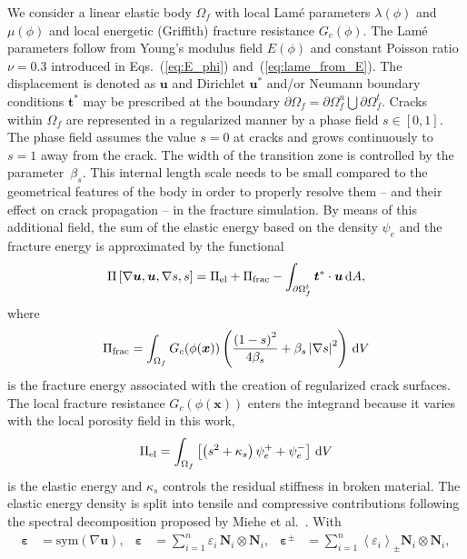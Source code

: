 \documentclass[
	pdflatex,
	sn-mathphys-num
]{sn-jnl}
\theoremstyle{thmstyleone}%
\theoremstyle{thmstyletwo}%
\theoremstyle{thmstylethree}%
\begin{document}
We consider a linear elastic body $\Omega_f$  with local
Lam\'{e} parameters $\lambda(\phi)$ and $\mu(\phi)$ and local
energetic (Griffith) fracture resistance $G_c(\phi)$. The Lam\'{e} parameters follow from
Young's modulus field $E(\phi)$ and constant Poisson ratio
$\nu=0.3$ introduced in Eqs.~(\ref{eq:E_phi})
and~(\ref{eq:lame_from_E}). The displacement is denoted as
$\boldsymbol{u}$ and Dirichlet $\boldsymbol{u}^*$ and/or
Neumann boundary conditions $\boldsymbol{t}^*$ may be prescribed
at the boundary
$\partial\Omega_f=\partial\Omega_f^u\bigcup\partial\Omega_f^t$.
Cracks within $\Omega_f$ are represented in a regularized manner by a phase
field $s\in\left[0,1\right]$.
The phase field assumes the value $s=0$ at cracks and grows
continuously to $s=1$ away from the crack. The width of the
transition zone is controlled by the parameter~$\beta_s$. {This
		internal length scale needs to be small compared to the
		geometrical features of the body in order to properly resolve
		them -- and their effect on crack propagation -- in
		the fracture
		simulation.}
By means of this additional field, the sum of the elastic energy
based on the density $\psi_e$ and the fracture energy is
approximated by the functional
\begin{equation}
	\Pi\left[\nabla{\boldsymbol{u}},\boldsymbol{u},
	\nabla{s},s\right] =
	\Pi_\mathrm{el} + \Pi_\mathrm{frac} -
	\int_{\partial\Omega_f^t}\boldsymbol{t}^*\cdot{\boldsymbol{u}}
	\,{\rm{d}}A,
\end{equation}
where
\begin{equation}
	\Pi_\mathrm{frac} =
	\int_{\Omega_f} G_c(\phi(\boldsymbol{x})) \left( \dfrac{
			\left(1-s\right)^2}{4\beta_s} +
	\beta_s\left|\nabla{s}\right|^2 \right) \,{\rm{d}}V
\end{equation}
is the fracture energy associated with the creation of
regularized crack surfaces. The local fracture resistance
$G_c(\phi(\boldsymbol{x}))$ enters the integrand because it varies with
the local porosity field in this work,
\begin{equation}
	\Pi_\mathrm{el}=\int_{\Omega_f} \left[
		\left(s^2+\kappa_s\right)\psi_e^+ + \psi_e^- \right] \,{\rm{d}}V
	\label{eq:elastic_energy}
\end{equation}
is the elastic energy and $\kappa_s$ controls the residual stiffness
in broken material.
The elastic energy density is split into tensile and compressive
contributions following the spectral decomposition proposed by
Miehe et al.~\cite{miehe_phase_2010}. With
\begin{align}
	\boldsymbol{\varepsilon}                       & =
	\text{sym}\left(\nabla{\boldsymbol{u}}\right), &
	\boldsymbol{\varepsilon}                       & =
	\sum_{i=1}^{n}\varepsilon_i\,
	\boldsymbol{N}_i\otimes\boldsymbol{N}_i,
	                                               &
	 \boldsymbol{\varepsilon}^{\pm}                 & =
	\sum_{i=1}^{n}\left<\varepsilon_i\right>_{\pm}
	\boldsymbol{N}_i\otimes\boldsymbol{N}_i,
\end{align}
\end{document}
